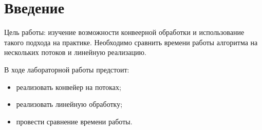 \chapter*{Введение}


Цель работы: изучение возможности конвеерной обработки и использование такого подхода на практике. Необходимо сравнить времени работы алгоритма на нескольких потоков и линейную реализацию.


В ходе лабораторной работы предстоит:

\begin{itemize}

	\item реализовать конвейер на потоках; 

	\item реализовать линейную обработку; 

	\item провести сравнение времени работы.
\end{itemize}
